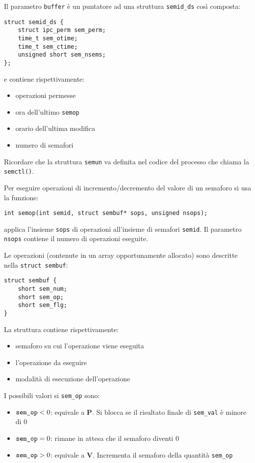 \documentclass[a4paper, 10pt]{article}
\begin{document}
Il parametro \verb|buffer| è un puntatore ad una struttura \verb|semid_ds| così composta:
\begin{verbatim}
struct semid_ds {
    struct ipc_perm sem_perm;
    time_t sem_otime;
    time_t sem_ctime;
    unsigned short sem_nsems;
};
\end{verbatim}

e contiene rispettivamente:
\begin{itemize}
\item operazioni permesse
\item ora dell'ultimo \verb|semop| 
\item orario dell'ultima modifica
\item numero di semafori
\end{itemize}

Ricordare che la struttura \verb|semun| va definita nel codice del processo che chiama la \verb|semctl()|.

Per eseguire operazioni di incremento/decremento del valore di un semaforo si usa la funzione:
\begin{verbatim}
int semop(int semid, struct sembuf* sops, unsigned nsops);
\end{verbatim}
applica l'insieme \verb|sops| di operazioni all'insieme di semafori \verb|semid|. Il parametro \verb|nsops| contiene il numero di operazioni eseguite.

Le operazioni (contenute in un array opportunamente allocato) sono descritte nella \verb|struct sembuf|:
\begin{verbatim}
struct sembuf {
    short sem_num;
    short sem_op;
    short sem_flg;
}
\end{verbatim}
La struttura contiene rispettivamente:
\begin{itemize}
\item semaforo su cui l'operazione viene eseguita
\item l'operazione da eseguire
\item modalità di esecuzione dell'operazione
\end{itemize}

I possibili valori si \verb|sem_op| sono:
\begin{itemize}
\item $\verb|sem_op|<0$: equivale a \textbf{P}. Si blocca se il risultato finale di \verb|sem_val| è minore di 0
\item $\verb|sem_op|=0$: rimane in attesa che il semaforo diventi 0
\item $\verb|sem_op|>0$: equivale a \textbf{V}. Incrementa il semaforo della quantità \verb|sem_op|
\end{itemize}
\end{document}

